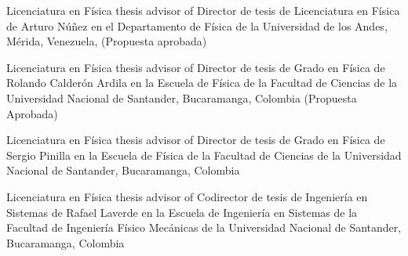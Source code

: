 \ifeng
Licenciatura en Física thesis advisor of
\else
Director de tesis de Licenciatura en Física de
\fi
Arturo Núñez en el Departamento de Física de la Universidad de los Andes, Mérida, Venezuela, (Propuesta aprobada)

\ifeng
Licenciatura en Física thesis advisor of
\else
Director de tesis de Grado en Física de
\fi
Rolando Calderón Ardila en la Escuela de Física de la Facultad de Ciencias de la Universidad Nacional de Santander, Bucaramanga, Colombia (Propuesta Aprobada)

\ifeng
Licenciatura en Física thesis advisor of
\else
Director de tesis de Grado en Física de
\fi
Sergio Pinilla en la Escuela de Física de la Facultad de Ciencias de la Universidad Nacional de Santander, Bucaramanga, Colombia 

\ifeng
Licenciatura en Física thesis advisor of
\else
Codirector de tesis de Ingeniería en Sistemas de
\fi
Rafael Laverde en la Escuela de Ingeniería en Sistemas de la Facultad de Ingeniería Físico Mecánicas de la Universidad Nacional de Santander, Bucaramanga, Colombia
